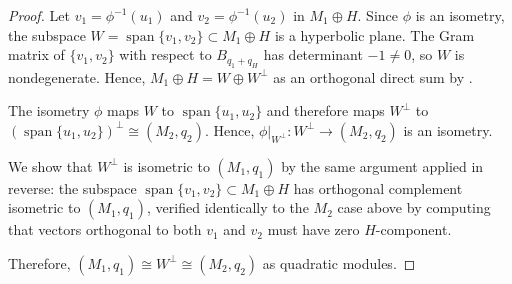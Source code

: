 \begin{proof}
    Let $v_1 = \phi^{-1}(u_1)$ and $v_2 = \phi^{-1}(u_2)$ in $M_1 \oplus H$. Since $\phi$ is an isometry, the subspace $W = \operatorname{span}\{v_1, v_2\} \subset M_1 \oplus H$ is a hyperbolic plane. The Gram matrix of $\{v_1, v_2\}$ with respect to $B_{q_1+q_H}$ has determinant $-1 \neq 0$, so $W$ is nondegenerate. Hence, $M_1 \oplus H = W \oplus W^{\perp}$ as an orthogonal direct sum by .

    The isometry $\phi$ maps $W$ to $\operatorname{span}\{u_1, u_2\}$ and therefore maps $W^{\perp}$ to $(\operatorname{span}\{u_1, u_2\})^{\perp} \cong (M_2, q_2)$. Hence, $\phi|_{W^{\perp}}: W^{\perp} \to (M_2, q_2)$ is an isometry.

    We show that $W^{\perp}$ is isometric to $(M_1, q_1)$ by the same argument applied in reverse: the subspace $\operatorname{span}\{v_1, v_2\} \subset M_1 \oplus H$ has orthogonal complement isometric to $(M_1, q_1)$, verified identically to the $M_2$ case above by computing that vectors orthogonal to both $v_1$ and $v_2$ must have zero $H$-component.

    Therefore, $(M_1, q_1) \cong W^{\perp} \cong (M_2, q_2)$ as quadratic modules.
\end{proof}